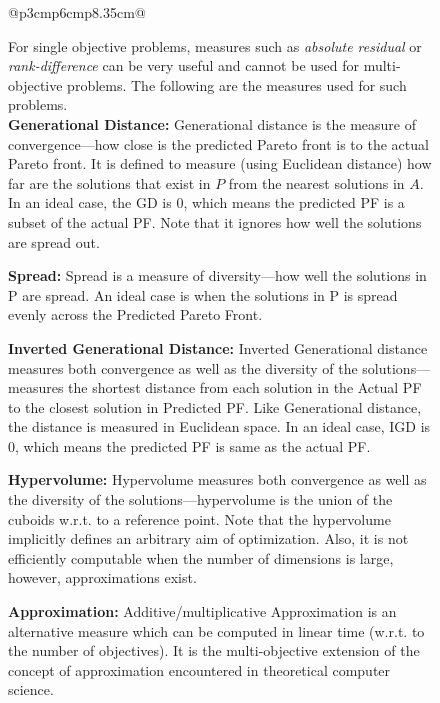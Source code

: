 \documentclass[sigconf,anonymous,review]{acmart}
\begin{document}
\begin{figure}
{\begin{tabular}{@{}p{3cm}p{6cm}p{8.35cm}@{}}
{\begin{minipage}[b]{0.33\linewidth}
                                \vspace{0.5cm}
                        \end{minipage}
                        \begin{minipage}[b]{0.67\linewidth}
                            \vspace{0.1cm}
                            For single objective problems, measures such as \textit{absolute residual} or \textit{rank-difference} can be very useful and cannot be used for multi-objective problems. The following are the measures used for such problems.\\
                            \textbf{Generational Distance: } Generational distance is the measure of convergence---how close is the predicted Pareto front is to the actual Pareto front. It is defined to measure (using Euclidean distance) how far are the solutions that exist in $P$ from the nearest solutions in $A$. In an ideal case, the GD is 0, which means the predicted PF is a subset of the actual PF. Note that it ignores how well the solutions are spread out.
                            
                            \textbf{Spread: } Spread is a measure of diversity---how well the solutions in P are spread. An ideal case is when the solutions in P is spread evenly across the Predicted Pareto Front. 
                            
                            \textbf{Inverted Generational Distance: } Inverted Generational distance measures both convergence as well as the diversity of the solutions---measures the shortest distance from each solution in the Actual PF to the closest solution in Predicted PF. Like Generational distance, the distance is measured in Euclidean space. In an ideal case, IGD is 0, which means the predicted PF is same as the actual PF.
                            
                            \textbf{Hypervolume: } Hypervolume measures both convergence as well as the diversity of the solutions---hypervolume is the union of the cuboids w.r.t. to a reference point. Note that the hypervolume implicitly defines an arbitrary aim of optimization. Also, it is not efficiently computable when the number of dimensions is large, however, approximations exist.
                            
                            \textbf{Approximation: } Additive/multiplicative Approximation is an alternative measure which can be computed in linear time (w.r.t. to the number of objectives). It is the multi-objective extension of the concept of approximation encountered in theoretical computer science. 
                    

\end{minipage}}
\end{tabular}}
\end{figure}
\end{document}

